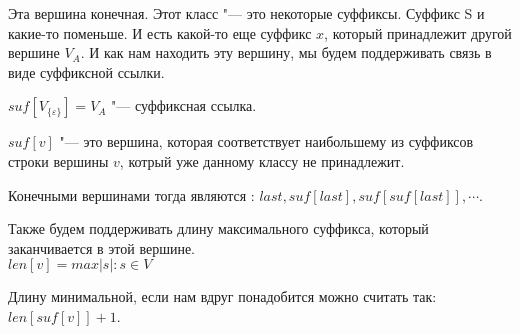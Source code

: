 \begin{description}
    Эта вершина конечная. Этот класс "--- это некоторые суффиксы. Суффикс S и какие-то поменьше.
    И есть какой-то еще суффикс $x$, который принадлежит другой вершине $V_A$. И как 
    нам находить эту вершину, мы будем поддерживать связь в виде суффиксной ссылки. 

    \begin{Def}
    $suf[V_{\{\varepsilon\}}] = V_A$ "--- суффиксная ссылка. 

    $suf[v]$ "--- это вершина, которая соответствует наибольшему из суффиксов строки вершины $v$, котрый 
    уже данному классу не принадлежит.
    \end{Def}

    Конечными вершинами тогда являются : $last, suf[last], suf[suf[last]], \cdots$.

    \begin{Def}
     Также будем поддерживать длину максимального суффикса, который заканчивается в этой вершине.\\
     $len[v] = max|s| \colon s \in V$
    \end{Def}
    
    Длину минимальной, если нам вдруг понадобится можно считать так: $len[suf[v]] + 1$.
    \end{description}
